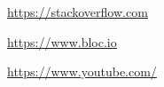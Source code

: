 \begin{thebibliography}{99999}
\singlespace\normalsize

  \url{https://stackoverflow.com}

  \url{https://www.bloc.io}

  \url{https://www.youtube.com/}

\end{thebibliography}
